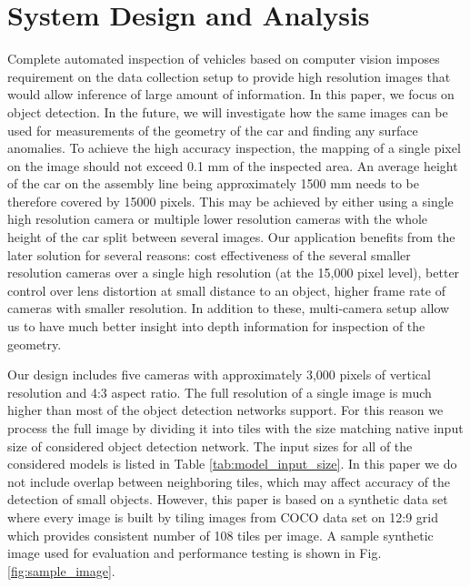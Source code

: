 \documentclass[conference]{IEEEtran}
\newcommand{\alnote}[1]{ {\textcolor{blue} { ***andre: #1 }}}
\newcommand{\alnote}[1]{}
\begin{document}
\section{System Design and Analysis}
Complete automated inspection of vehicles based on computer vision imposes requirement on the data collection setup to provide high resolution images that would allow inference of large amount of information. In this paper, we focus on object detection. In the future, we will investigate how the same images can be used for measurements of the geometry of the car and finding any surface anomalies. To achieve the high accuracy inspection, the mapping of a single pixel on the image should not exceed 0.1 mm of the inspected area. An average height of the car on the assembly line being approximately 1500 mm needs to be therefore covered by 15000 pixels. This may be achieved by either using a single high resolution camera or multiple lower resolution cameras with the whole height of the car split between several images. Our application benefits from the later solution for several reasons: cost effectiveness of the several smaller resolution cameras over a single high resolution (at the 15,000 pixel level), better control over lens distortion at small distance to an object, higher frame rate of cameras with smaller resolution. In addition to these, multi-camera setup allow us to have much better insight into depth information for inspection of the geometry. 

Our design includes five cameras with approximately 3,000 pixels of vertical resolution and 4:3 aspect ratio. The full resolution of a single image is much higher than most of the object detection networks support. For this reason we process the full image by dividing it into tiles with the size matching native input size of considered object detection network. The input sizes for all of the considered models is listed in Table \ref{tab:model_input_size}. In this paper we do not include overlap between neighboring tiles, which may affect accuracy of the detection of small objects. However, this paper is based on a synthetic data set where every image is built by tiling images from COCO data set on 12:9 grid which provides consistent number of 108 tiles per image. 
A sample synthetic image used for evaluation and performance testing is shown in Fig. \ref{fig:sample_image}.

\end{document}
